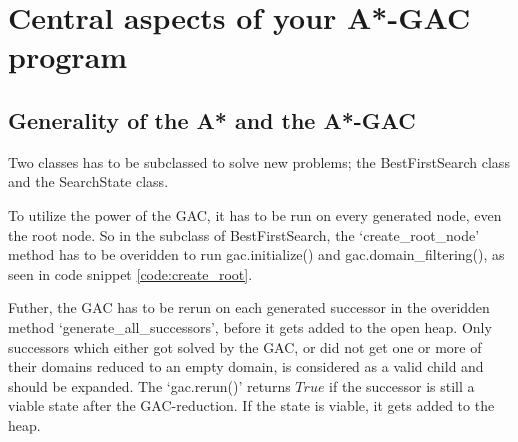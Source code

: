
\section{Central aspects of your A*-GAC program}
\subsection{Generality of the A* and the A*-GAC}
Two classes has to be subclassed to solve new problems; the BestFirstSearch class and the SearchState class. 

To utilize the power of the GAC, it has to be run on every generated node, even the root node. So in the subclass of BestFirstSearch, the `create\_root\_node' method has to be overidden to run gac.initialize() and gac.domain\_filtering(), as seen in code snippet \ref{code:create_root}. 



Futher, the GAC has to be rerun on each generated successor in the overidden method `generate\_all\_successors', before it gets added to the open heap. Only successors which either got solved by the GAC, or did not get one or more of their domains reduced to an empty domain, is considered as a valid child and should be expanded. The `gac.rerun()' returns \(True\) if the successor is still a viable state after the GAC-reduction. If the state is viable, it gets added to the heap.

